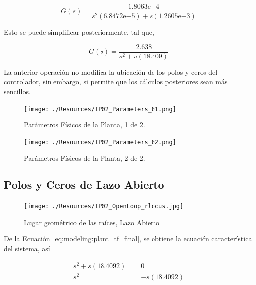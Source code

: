 \documentclass[12pt,a4paper]{article}
\newcommand{\expnum}[2]{{#1}\mathrm{e}{#2}}
\begin{document}
        \begin{equation}
          G\left(s\right) = \frac{\expnum{1.8063}{-4}}{s^{2}\left(\expnum{6.8472}{-5}\right) + s\left(\expnum{1.2605}{-3}\right)}
          \label{eq:modeling:plant_tf}
        \end{equation}

        Esto se puede simplificar posteriormente, tal que,  
        
        \begin{equation}
          G\left(s\right) = \frac{2.638}{s^{2} + s\left(18.409\right)}
          \label{eq:modeling:plant_tf_final}
        \end{equation}

        La anterior operación no modifica la ubicación de los polos y ceros del controlador, sin embargo, 
        si permite que los cálculos posteriores sean más sencillos. 

        \begin{figure}
          \centering
          \texttt{[image: ./Resources/IP02\_Parameters\_01.png]}
          \caption{Parámetros Físicos de la Planta, 1 de 2. }
          \label{fig:modeling:plant_parameters_01}
        \end{figure}

        \begin{figure}
          \centering
          \texttt{[image: ./Resources/IP02\_Parameters\_02.png]}
          \caption{Parámetros Físicos de la Planta, 2 de 2. }
          \label{fig:modeling:plant_parameters_02}
        \end{figure}

    \subsection{Polos y Ceros de Lazo Abierto}

      \begin{figure}
        \centering
        \texttt{[image: ./Resources/IP02\_OpenLoop\_rlocus.jpg]}
        \caption{Lugar geométrico de las raíces, Lazo Abierto}
        \label{fig:modeling:open_loop_root_locus}
      \end{figure}

      De la Ecuación~\ref{eq:modeling:plant_tf_final}, se obtiene la ecuación característica del sistema, 
      así, 

        \begin{equation*}
          \begin{aligned}
            s^{2}+ s\left(18.4092\right) &= 0 \\
            s^{2} &= -s\left(18.4092\right)\\
          \end{aligned}
          \label{eq*:modeling:roots}
        \end{equation*}    
\end{document}
